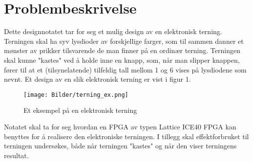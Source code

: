\section{Problembeskrivelse}
\label{problemBeskrivelse}

Dette designnotatet tar for seg et mulig design av en elektronisk terning. Terningen skal ha syv lysdioder av forskjellige farger, som til sammen 
danner et mønster av prikker tilsvarende de man finner på en ordinær terning. Terningen skal kunne "kastes" ved å holde inne en knapp, som, når man slipper 
knappen, fører til at et (tilsynelatende) tilfeldig tall mellom 1 og 6 vises på lysdiodene som nevnt. Et design av en slik elektronisk terning er vist 
i figur 1.

\begin{figure}[H]
    \centering
    \texttt{[image: Bilder/terning\_ex.png]}
    \caption{Et eksempel på en elektronisk terning}
\end{figure}

Notatet skal ta for seg hvordan en FPGA av typen Lattice ICE40 FPGA kan benyttes for å realisere den elektroniske terningen.
I tillegg skal effektforbruket til terningen undersøkes, både når terningen "kastes" og når den viser terningens resultat.
